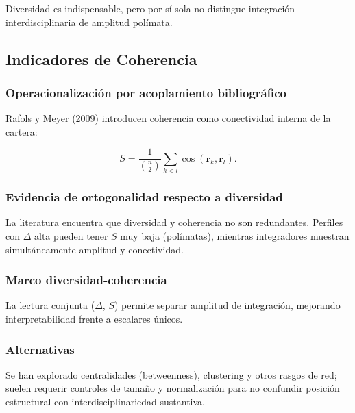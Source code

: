 \documentclass[
]{article}
\begin{document}
Diversidad es indispensable, pero por sí sola no distingue integración
interdisciplinaria de amplitud polímata.

\hypertarget{indicadores-de-coherencia}{%
\subsection{Indicadores de Coherencia}\label{indicadores-de-coherencia}}

\hypertarget{operacionalizaciuxf3n-por-acoplamiento-bibliogruxe1fico}{%
\subsubsection{Operacionalización por acoplamiento
bibliográfico}\label{operacionalizaciuxf3n-por-acoplamiento-bibliogruxe1fico}}

Rafols y Meyer (2009) introducen coherencia como conectividad interna de
la cartera:

\[S = \frac{1}{\binom{n}{2}}\sum_{k<l}\cos(\mathbf r_k,\mathbf r_l).\]

\hypertarget{evidencia-de-ortogonalidad-respecto-a-diversidad}{%
\subsubsection{Evidencia de ortogonalidad respecto a
diversidad}\label{evidencia-de-ortogonalidad-respecto-a-diversidad}}

La literatura encuentra que diversidad y coherencia no son redundantes.
Perfiles con \(\Delta\) alta pueden tener \(S\) muy baja (polímatas),
mientras integradores muestran simultáneamente amplitud y conectividad.

\hypertarget{marco-diversidad-coherencia}{%
\subsubsection{Marco
diversidad-coherencia}\label{marco-diversidad-coherencia}}

La lectura conjunta (\(\Delta\), \(S\)) permite separar amplitud de
integración, mejorando interpretabilidad frente a escalares únicos.

\hypertarget{alternativas}{%
\subsubsection{Alternativas}\label{alternativas}}

Se han explorado centralidades (betweenness), clustering y otros rasgos
de red; suelen requerir controles de tamaño y normalización para no
confundir posición estructural con interdisciplinariedad sustantiva.
\end{document}
